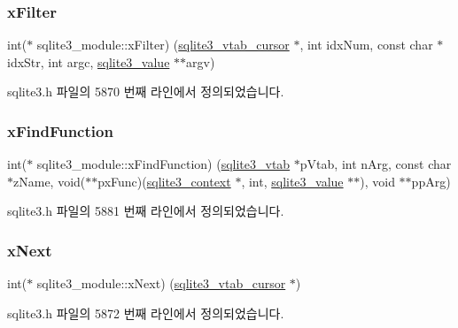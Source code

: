 \subsubsection{\texorpdfstring{x\+Filter}{xFilter}}
{\footnotesize\ttfamily int($\ast$ sqlite3\+\_\+module\+::x\+Filter) (\hyperlink{structsqlite3__vtab__cursor}{sqlite3\+\_\+vtab\+\_\+cursor} $\ast$, int idx\+Num, const char $\ast$idx\+Str, int argc, \hyperlink{sqlite3_8h_ac2fa1ecdb2290d9af6010edbd1cbc83c}{sqlite3\+\_\+value} $\ast$$\ast$argv)}



sqlite3.\+h 파일의 5870 번째 라인에서 정의되었습니다.

\mbox{\label{structsqlite3__module_afb7bf9d156a767a50f5e9d92b135a80f}} 
\subsubsection{\texorpdfstring{x\+Find\+Function}{xFindFunction}}
{\footnotesize\ttfamily int($\ast$ sqlite3\+\_\+module\+::x\+Find\+Function) (\hyperlink{structsqlite3__vtab}{sqlite3\+\_\+vtab} $\ast$p\+Vtab, int n\+Arg, const char $\ast$z\+Name, void($\ast$$\ast$px\+Func)(\hyperlink{sqlite3_8h_a3b519553ffec8fc42b2356f5b1ebdc57}{sqlite3\+\_\+context} $\ast$, int, \hyperlink{sqlite3_8h_ac2fa1ecdb2290d9af6010edbd1cbc83c}{sqlite3\+\_\+value} $\ast$$\ast$), void $\ast$$\ast$pp\+Arg)}



sqlite3.\+h 파일의 5881 번째 라인에서 정의되었습니다.

\mbox{\label{structsqlite3__module_a7a95af281219212e50f3417f8c816bfc}} 
\subsubsection{\texorpdfstring{x\+Next}{xNext}}
{\footnotesize\ttfamily int($\ast$ sqlite3\+\_\+module\+::x\+Next) (\hyperlink{structsqlite3__vtab__cursor}{sqlite3\+\_\+vtab\+\_\+cursor} $\ast$)}



sqlite3.\+h 파일의 5872 번째 라인에서 정의되었습니다.

